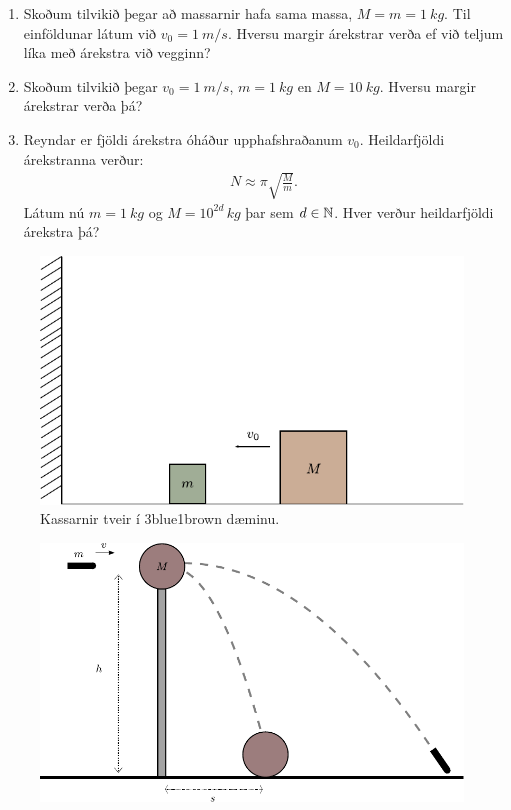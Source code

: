 \ifdefined \wholebook \else\documentclass[oneside]{book}\usepackage{EdlBook}\graphicspath{{figures/}}
\begin{document}
\begin{enumerate}[label = \textbf{Dæmi \thechapter.\arabic*.}]
\begin{enumerate}[label = \textbf{(\alph*)}]
    \item Skoðum tilvikið þegar að massarnir hafa sama massa, $M = m = \SI{1}{kg}$. Til einföldunar látum við $v_0 = \SI{1}{m/s}$. Hversu margir árekstrar verða ef við teljum líka með árekstra við vegginn?
    
    \item Skoðum tilvikið þegar $v_0 = \SI{1}{m/s}$, $m = \SI{1}{kg}$ en $M = \SI{10}{kg}$. Hversu margir árekstrar verða þá?
    
    \item Reyndar er fjöldi árekstra óháður upphafshraðanum $v_0$. Heildarfjöldi árekstranna verður:
    \begin{align*}
        N \approx \pi \sqrt{\frac{M}{m}}.
    \end{align*}
    Látum nú $m = \SI{1}{kg}$ og $M = 10^{2d} \, \si{kg}$ þar sem $d \in \mathbb{N}$. Hver verður heildarfjöldi árekstra þá?
\end{enumerate}


\begin{figure}[H]
    \centering
    \includegraphics[scale = 0.8]{figures/3b1b.pdf}
    \caption{Kassarnir tveir í 3blue1brown dæminu.}
    \label{fig:3blue1brown}
\end{figure}

\begin{minipage}{\linewidth}
\begin{figure}
\centering
\vspace{-0.5cm}
\includegraphics[scale = 0.8]{figures/ipho1966.pdf}
   \label{fig:ipho1966}
\end{figure}


\end{minipage}
\end{enumerate}
\end{document}
